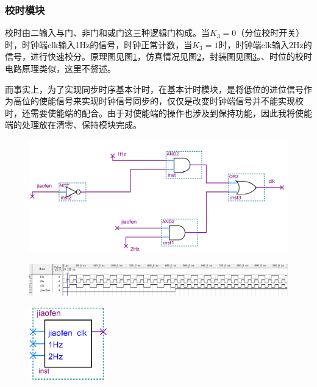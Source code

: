 \documentclass[12pt]{article}
\begin{document}
\subsubsection{校时模块}
校时由二输入与门、非门和或门这三种逻辑门构成。当$K_3=0$（分位校时开关）时，时钟端clk输入1Hz的信号，时钟正常计数，当$K_3=1$时，时钟端clk输入2Hz的信号，进行快速校分。原理图见图\ref{fig:jiao}，仿真情况见图\ref{fig:fzjiao}，封装图见图\ref{fig:fengzhuangjiao}。、时位的校时电路原理类似，这里不赘述。\par 而事实上，为了实现同步时序基本计时，在基本计时模块，是将低位的进位信号作为高位的使能信号来实现时钟信号同步的，仅仅是改变时钟端信号并不能实现校时，还需要使能端的配合。由于对使能端的操作也涉及到保持功能，因此我将使能端的处理放在清零、保持模块完成。
\begin{figure}[hp]
	\centering  
	\includegraphics[width=\textwidth]{picture/jiao.png} 
	\caption{}
	\label{fig:jiao}   
\end{figure}
\begin{figure}[hp]
	\centering  
	\includegraphics[width=\textwidth]{picture/fzjiaofen.png} 
	\caption{}
	\label{fig:fzjiao}   
\end{figure}
\begin{figure}[hp]
	\centering  
	\includegraphics[width=0.3\textwidth]{picture/fenzhuangjiao.png} 
	\caption{}
	\label{fig:fengzhuangjiao}   
\end{figure}\par
\end{document}
